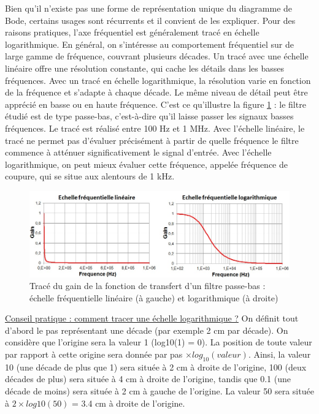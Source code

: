 \documentclass[]{report}
\begin{document}
	Bien qu'il n'existe pas une forme de représentation unique du diagramme de Bode, certains usages sont récurrents et il convient de les expliquer. Pour des raisons pratiques, l'axe fréquentiel est généralement tracé en échelle logarithmique. En général, on s'intéresse au comportement fréquentiel sur de large gamme de fréquence, couvrant plusieurs décades. Un tracé avec une échelle linéaire offre une résolution constante, qui cache les détails dans les basses fréquences. Avec un tracé en échelle logarithmique, la résolution varie en fonction de la fréquence et s'adapte à chaque décade. Le même niveau de détail peut être apprécié en basse ou en haute fréquence. C'est ce qu'illustre la figure \ref{Fig:Effet_Flin_log} : le filtre étudié est de type passe-bas, c'est-à-dire qu'il laisse passer les signaux basses fréquences. Le tracé est réalisé entre 100 Hz et 1 MHz. Avec l'échelle linéaire, le tracé ne permet pas d'évaluer précisément à partir de quelle fréquence le filtre commence à atténuer significativement le signal d'entrée. Avec l'échelle logarithmique, on peut mieux évaluer cette fréquence, appelée fréquence de coupure, qui se situe aux alentours de 1 kHz.
	\begin{figure}[h]
		\centering
		\includegraphics[scale=0.6]{images/Effet_Flin_log.jpg}
		\caption{Tracé du gain de la fonction de transfert d'un filtre passe-bas : échelle fréquentielle linéaire (à gauche) et logarithmique (à droite)}	
		\label{Fig:Effet_Flin_log} 
	\end{figure}
	\underline{Conseil pratique : comment tracer une échelle logarithmique ?}
	On définit tout d'abord le pas représentant une décade (par exemple 2 cm par décade). On considère que l'origine sera la valeur 1 (log10(1) = 0). La position de toute valeur par rapport à cette origine sera donnée par pas $\times log_{10}(valeur)$. Ainsi, la valeur 10 (une décade de plus que 1) sera située à 2 cm à droite de l'origine, 100 (deux décades de plus) sera située à 4 cm à droite de l'origine, tandis que 0.1 (une décade de moins) sera située à 2 cm à gauche de l'origine. La valeur 50 sera située à $2\times log10(50)$ = 3.4 cm à droite de l'origine.
	
\end{document}
